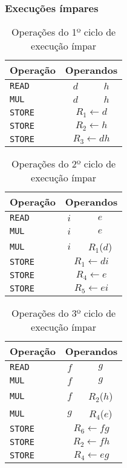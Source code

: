 \begin{multicols}{2}

\subsubsection{Execuções ímpares}

\begin{table}[H]
\centering
\begin{tabular}{l|c|c}
Operação & \multicolumn{2}{c}{Operandos} \\
\hline
\texttt{READ} & $d$ & $h$ \\
\hline
\texttt{MUL} & $d$ & $h$ \\
\hline
\texttt{STORE} & \multicolumn{2}{c}{$R_1\leftarrow d$} \\
\texttt{STORE} & \multicolumn{2}{c}{$R_2\leftarrow h$} \\
\texttt{STORE} & \multicolumn{2}{c}{$R_3\leftarrow dh$} \\
\end{tabular}
\caption{Operações do 1º ciclo de execução ímpar}
\label{tab:odd_1}
\end{table}

\begin{table}[H]
\centering
\begin{tabular}{l|c|c}
Operação & \multicolumn{2}{c}{Operandos} \\
\hline
\texttt{READ} & $i$ & $e$ \\
\hline
\texttt{MUL} & $i$ & $e$ \\
\texttt{MUL} & $i$ & $R_1$($d$) \\
\hline
\texttt{STORE} & \multicolumn{2}{c}{$R_1\leftarrow di$} \\
\texttt{STORE} & \multicolumn{2}{c}{$R_4\leftarrow e$} \\
\texttt{STORE} & \multicolumn{2}{c}{$R_5\leftarrow ei$} \\
\end{tabular}
\caption{Operações do 2º ciclo de execução ímpar}
\label{tab:odd_2}
\end{table}

\begin{table}[H]
\centering
\begin{tabular}{l|c|c}
Operação & \multicolumn{2}{c}{Operandos} \\
\hline
\texttt{READ} & $f$ & $g$ \\
\hline
\texttt{MUL} & $f$ & $g$ \\
\texttt{MUL} & $f$ & $R_2$($h$) \\
\texttt{MUL} & $g$ & $R_4$($e$) \\
\hline
\texttt{STORE} & \multicolumn{2}{c}{$R_6\leftarrow fg$} \\
\texttt{STORE} & \multicolumn{2}{c}{$R_2\leftarrow fh$} \\
\texttt{STORE} & \multicolumn{2}{c}{$R_4\leftarrow eg$} \\
\end{tabular}
\caption{Operações do 3º ciclo de execução ímpar}
\label{tab:odd_3}
\end{table}


\end{multicols}
